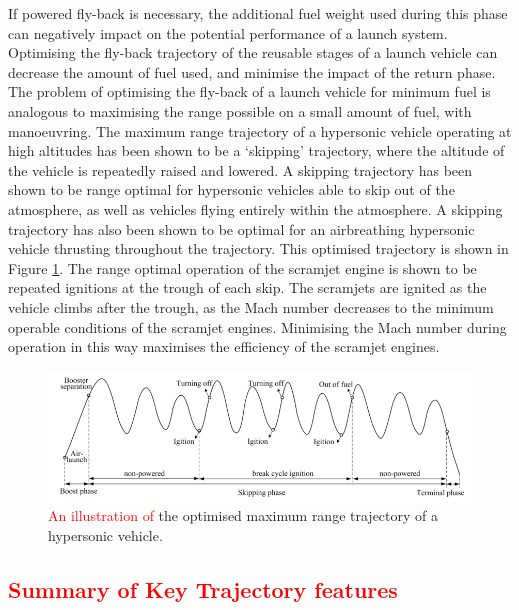 If powered fly-back is necessary, the additional fuel weight used during this phase can negatively impact on the potential performance of a launch system. 
Optimising the fly-back trajectory of the reusable stages of a launch vehicle can decrease the amount of fuel used, and minimise the impact of the return phase. 
 The problem of optimising the fly-back of a launch vehicle for minimum fuel is analogous to maximising the range possible on a small amount of fuel, with manoeuvring. The maximum range trajectory of a hypersonic vehicle operating at high altitudes has been shown to be a `skipping' trajectory, where the altitude of the vehicle is repeatedly raised and lowered\cite{Moshman2014,Darby2011,Toso2015,Chai2015}. A skipping trajectory has been shown to be range optimal for hypersonic vehicles able to skip out of the atmosphere\cite{Eggers1957,Moshman2014}, as well as vehicles flying entirely within the atmosphere\cite{Moshman2014,Darby2011,Toso2015,Tetlow1992}. A skipping trajectory has also been shown to be optimal for an airbreathing hypersonic vehicle thrusting throughout the trajectory\cite{Kanda2007,Chai2015}. This optimised trajectory is shown in Figure \ref{fig:chai-boostskip}. The range optimal operation of the scramjet engine is shown to be repeated ignitions at the trough of each skip\cite{Chai2015}. The scramjets are ignited as the vehicle climbs after the trough, as the Mach number decreases to the minimum operable conditions of the scramjet engines\cite{Chai2015}. Minimising the Mach number during operation in this way maximises the efficiency of the scramjet engines\cite{Chai2015}.
 
 \begin{figure}[ht]
 	\centering
 	\includegraphics[width=0.9\linewidth]{"figures/2_literature-review/chai-boost skip"}
 	\caption{\textcolor{red}{An illustration of }the optimised maximum range trajectory of a hypersonic vehicle\cite{Chai2015}.}
 	\label{fig:chai-boostskip}
 \end{figure}

\textcolor{red}{
	\subsection{Summary of Key Trajectory features}
}

